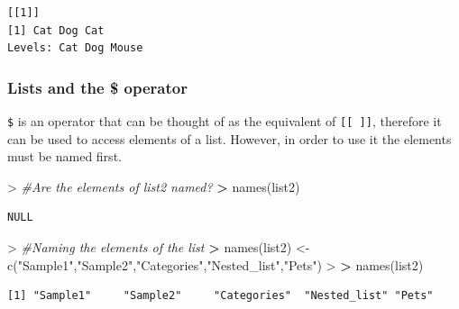 \documentclass[
]{book}
\newenvironment{Shaded}{\begin{snugshade}}{\end{snugshade}}
\newcommand{\CommentTok}[1]{\textcolor[rgb]{0.56,0.35,0.01}{\textit{#1}}}
\newcommand{\ErrorTok}[1]{\textcolor[rgb]{0.64,0.00,0.00}{\textbf{#1}}}
\newcommand{\FunctionTok}[1]{\textcolor[rgb]{0.00,0.00,0.00}{#1}}
\newcommand{\NormalTok}[1]{#1}
\newcommand{\OtherTok}[1]{\textcolor[rgb]{0.56,0.35,0.01}{#1}}
\newcommand{\SpecialCharTok}[1]{\textcolor[rgb]{0.00,0.00,0.00}{#1}}
\newcommand{\StringTok}[1]{\textcolor[rgb]{0.31,0.60,0.02}{#1}}
\theoremstyle{definition}
\theoremstyle{definition}
\theoremstyle{definition}
\theoremstyle{definition}
\theoremstyle{remark}
\begin{document}
\begin{verbatim}
[[1]]
[1] Cat Dog Cat
Levels: Cat Dog Mouse
\end{verbatim}

\hypertarget{lists-and-the-operator}{%
\subsubsection*{\texorpdfstring{\textbf{Lists and the \$ operator}}{Lists and the \$ operator}}\label{lists-and-the-operator}}

\texttt{\$} is an operator that can be thought of as the equivalent of \texttt{{[}{[}\ {]}{]}}, therefore it can be used to access elements of a list. However, in order to use it the elements must be named first.

\begin{Shaded}
\begin{Highlighting}[]
\SpecialCharTok{\textgreater{}} \CommentTok{\#Are the elements of list2 named?}
\ErrorTok{\textgreater{}} \FunctionTok{names}\NormalTok{(list2)}
\end{Highlighting}
\end{Shaded}

\begin{verbatim}
NULL
\end{verbatim}

\begin{Shaded}
\begin{Highlighting}[]
\SpecialCharTok{\textgreater{}} \CommentTok{\#Naming the elements of the list}
\ErrorTok{\textgreater{}} \FunctionTok{names}\NormalTok{(list2) }\OtherTok{\textless{}{-}} \FunctionTok{c}\NormalTok{(}\StringTok{"Sample1"}\NormalTok{,}\StringTok{"Sample2"}\NormalTok{,}\StringTok{"Categories"}\NormalTok{,}\StringTok{"Nested\_list"}\NormalTok{,}\StringTok{"Pets"}\NormalTok{)}
\SpecialCharTok{\textgreater{}} 
\ErrorTok{\textgreater{}} \FunctionTok{names}\NormalTok{(list2)}
\end{Highlighting}
\end{Shaded}

\begin{verbatim}
[1] "Sample1"     "Sample2"     "Categories"  "Nested_list" "Pets"       
\end{verbatim}

\begin{Shaded}
\end{Shaded}
\end{document}
